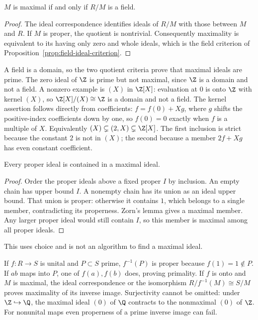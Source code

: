 \begin{proposition}\label{prop:maximal-quotient}
$M$ is maximal if and only if $R/M$ is a field.
\end{proposition}
\begin{proof}
The ideal correspondence identifies ideals of $R/M$ with those between
$M$ and $R$. If $M$ is proper, the quotient is nontrivial.
Consequently maximality is equivalent to its having only zero and whole
ideals, which is the field criterion
of Proposition~\ref{prop:field-ideal-criterion}.
\end{proof}

A field is a domain, so the two quotient criteria prove that maximal
ideals are prime. The zero ideal of $\Z$ is prime but not maximal,
since $\Z$ is a domain and not a field. A nonzero example is $(X)$ in
$\Z[X]$: evaluation at $0$ is onto $\Z$ with kernel $(X)$, so
$\Z[X]/(X)\cong\Z$ is a domain and not a field.
The kernel assertion follows directly from coefficients:
$f=f(0)+Xg$, where $g$ shifts the positive-index coefficients down
by one, so $f(0)=0$ exactly when $f$ is a multiple of $X$.
Equivalently $(X)\subsetneq(2,X)\subsetneq\Z[X]$.
The first inclusion is strict because the constant $2$ is not in $(X)$;
the second because a member $2f+Xg$ has even constant coefficient.

\begin{theorem}\label{thm:maximal-ideal-existence}
Every proper ideal is contained in a maximal ideal.
\end{theorem}
\begin{proof}
Order the proper ideals above a fixed proper $I$ by inclusion.
An empty chain has upper bound $I$. A nonempty chain has its union
as an ideal upper bound. That union is proper: otherwise it contains
$1$, which belongs to a single member, contradicting its properness.
Zorn's lemma gives a maximal member. Any larger proper ideal would still
contain $I$, so this member is maximal among all proper ideals.
\end{proof}
This uses choice and is not an algorithm to find a maximal ideal.

If $f:R\to S$ is unital and $P\subset S$ prime, $f^{-1}(P)$ is proper
because $f(1)=1\notin P$. If $ab$ maps into $P$, one of $f(a),f(b)$
does, proving primality. If $f$ is onto and $M$ is maximal, the ideal
correspondence or the isomorphism
$R/f^{-1}(M)\cong S/M$ proves maximality of its inverse image.
Surjectivity cannot be omitted: under $\Z\hookrightarrow\Q$, the
maximal ideal $(0)$ of $\Q$ contracts to the nonmaximal $(0)$ of $\Z$.
For nonunital maps even properness of a prime inverse image can fail.

